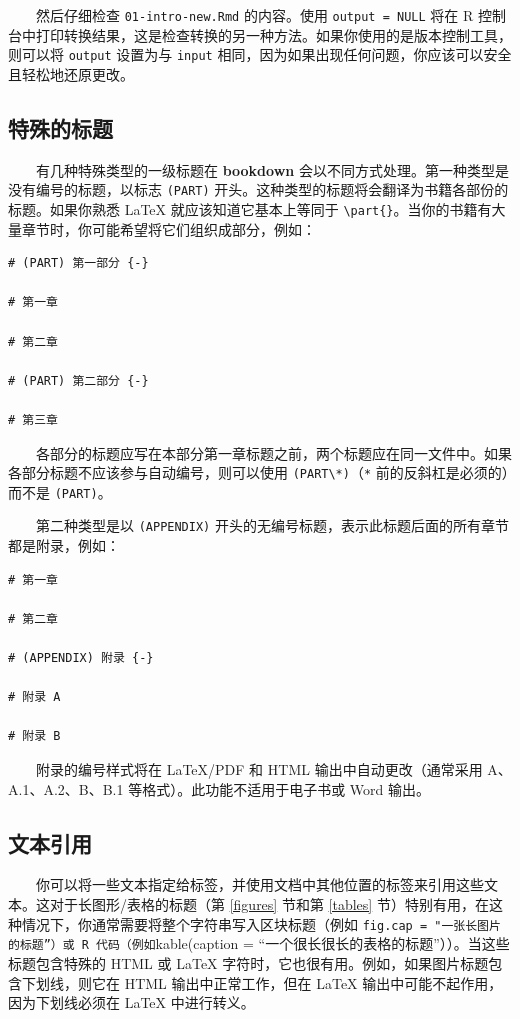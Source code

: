 \documentclass[
  12pt,
]{krantz}
\theoremstyle{definition}
\theoremstyle{definition}
\theoremstyle{definition}
\theoremstyle{definition}
\theoremstyle{remark}
\begin{document}
  然后仔细检查 \texttt{01-intro-new.Rmd} 的内容。使用 \texttt{output\ =\ NULL} 将在 R 控制台中打印转换结果，这是检查转换的另一种方法。如果你使用的是版本控制工具，则可以将 \texttt{output} 设置为与 \texttt{input} 相同，因为如果出现任何问题，你应该可以安全且轻松地还原更改。

\hypertarget{ux7279ux6b8aux7684ux6807ux9898}{%
\subsection{特殊的标题}\label{ux7279ux6b8aux7684ux6807ux9898}}

  有几种特殊类型的一级标题在 \textbf{bookdown} 会以不同方式处理。第一种类型是没有编号的标题，以标志 \texttt{(PART)} 开头。这种类型的标题将会翻译为书籍各部份的标题。如果你熟悉 LaTeX 就应该知道它基本上等同于 \texttt{\textbackslash{}part\{\}}。当你的书籍有大量章节时，你可能希望将它们组织成部分，例如：

\begin{verbatim}
# (PART) 第一部分 {-} 

# 第一章

# 第二章

# (PART) 第二部分 {-} 

# 第三章
\end{verbatim}

  各部分的标题应写在本部分第一章标题之前，两个标题应在同一文件中。如果各部分标题不应该参与自动编号，则可以使用 \texttt{(PART\textbackslash{}*)}（\texttt{*} 前的反斜杠是必须的）而不是 \texttt{(PART)}。

  第二种类型是以 \texttt{(APPENDIX)} 开头的无编号标题，表示此标题后面的所有章节都是附录，例如：

\begin{verbatim}
# 第一章

# 第二章

# (APPENDIX) 附录 {-} 

# 附录 A

# 附录 B
\end{verbatim}

  附录的编号样式将在 LaTeX/PDF 和 HTML 输出中自动更改（通常采用 A、A.1、A.2、B、B.1 等格式）。此功能不适用于电子书或 Word 输出。

\hypertarget{text-references}{%
\subsection{文本引用}\label{text-references}}

  你可以将一些文本指定给标签，并使用文档中其他位置的标签来引用这些文本。这对于长图形/表格的标题（第 \ref{figures} 节和第 \ref{tables} 节）特别有用，在这种情况下，你通常需要将整个字符串写入区块标题（例如 \texttt{fig.cap\ =\ "一张长图片的标题”）或\ R\ 代码（例如}kable(caption = ``一个很长很长的表格的标题''））。当这些标题包含特殊的 HTML 或 LaTeX 字符时，它也很有用。例如，如果图片标题包含下划线，则它在 HTML 输出中正常工作，但在 LaTeX 输出中可能不起作用，因为下划线必须在 LaTeX 中进行转义。
\end{document}
